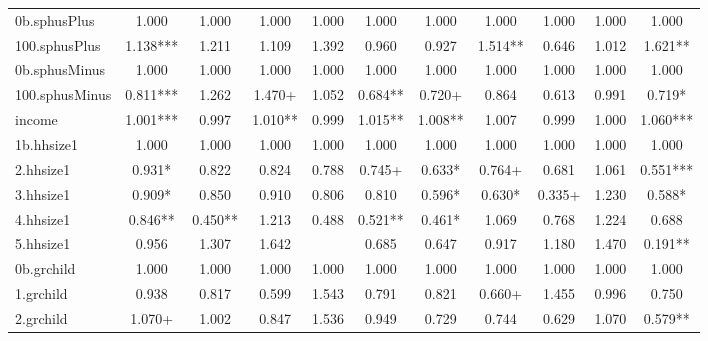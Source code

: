 {\begin{tabular}{l*{10}{c}}
0b.sphusPlus&       1.000   &       1.000   &       1.000   &       1.000   &       1.000   &       1.000   &       1.000   &       1.000   &       1.000   &       1.000   \\
100.sphusPlus&       1.138***&       1.211   &       1.109   &       1.392   &       0.960   &       0.927   &       1.514** &       0.646   &       1.012   &       1.621** \\
0b.sphusMinus&       1.000   &       1.000   &       1.000   &       1.000   &       1.000   &       1.000   &       1.000   &       1.000   &       1.000   &       1.000   \\
100.sphusMinus&       0.811***&       1.262   &       1.470+  &       1.052   &       0.684** &       0.720+  &       0.864   &       0.613   &       0.991   &       0.719*  \\
income      &       1.001***&       0.997   &       1.010** &       0.999   &       1.015** &       1.008** &       1.007   &       0.999   &       1.000   &       1.060***\\
1b.hhsize1  &       1.000   &       1.000   &       1.000   &       1.000   &       1.000   &       1.000   &       1.000   &       1.000   &       1.000   &       1.000   \\
2.hhsize1   &       0.931*  &       0.822   &       0.824   &       0.788   &       0.745+  &       0.633*  &       0.764+  &       0.681   &       1.061   &       0.551***\\
3.hhsize1   &       0.909*  &       0.850   &       0.910   &       0.806   &       0.810   &       0.596*  &       0.630*  &       0.335+  &       1.230   &       0.588*  \\
4.hhsize1   &       0.846** &       0.450** &       1.213   &       0.488   &       0.521** &       0.461*  &       1.069   &       0.768   &       1.224   &       0.688   \\
5.hhsize1   &       0.956   &       1.307   &       1.642   &               &       0.685   &       0.647   &       0.917   &       1.180   &       1.470   &       0.191** \\
0b.grchild  &       1.000   &       1.000   &       1.000   &       1.000   &       1.000   &       1.000   &       1.000   &       1.000   &       1.000   &       1.000   \\
1.grchild   &       0.938   &       0.817   &       0.599   &       1.543   &       0.791   &       0.821   &       0.660+  &       1.455   &       0.996   &       0.750   \\
2.grchild   &       1.070+  &       1.002   &       0.847   &       1.536   &       0.949   &       0.729   &       0.744   &       0.629   &       1.070   &       0.579** \\

\end{tabular}}
